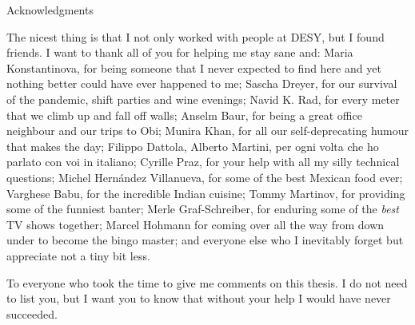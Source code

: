 \begin{abstractpage}{Acknowledgments}
   
    The nicest thing is that I not only worked with people at DESY, but I found friends.
    I want to thank all of you for helping me stay sane and:
    Maria Konstantinova, for being someone that I never expected to find here and yet nothing better could have ever happened to me;
    Sascha Dreyer, for our survival of the pandemic, shift parties and wine evenings;
    Navid K. Rad, for every meter that we climb up and fall off walls;
    Anselm Baur, for being a great office neighbour and our trips to Obi;
    Munira Khan, for all our self-deprecating humour that makes the day;
    Filippo Dattola, Alberto Martini, per ogni volta che ho parlato con voi in italiano;
    Cyrille Praz, for your help with all my silly technical questions;
    Michel Hern\'andez Villanueva, for some of the best Mexican food ever;
    Varghese Babu, for the incredible Indian cuisine;
    Tommy Martinov, for providing some of the funniest banter;
    Merle Graf-Schreiber, for enduring some of the \textit{best} TV shows together;
    Marcel Hohmann for coming over all the way from down under to become the bingo master;
    and everyone else who I inevitably forget but appreciate not a tiny bit less.

    To everyone who took the time to give me comments on this thesis.
    I do not need to list you, but I want you to know that without your help I would have never succeeded.


\end{abstractpage}
